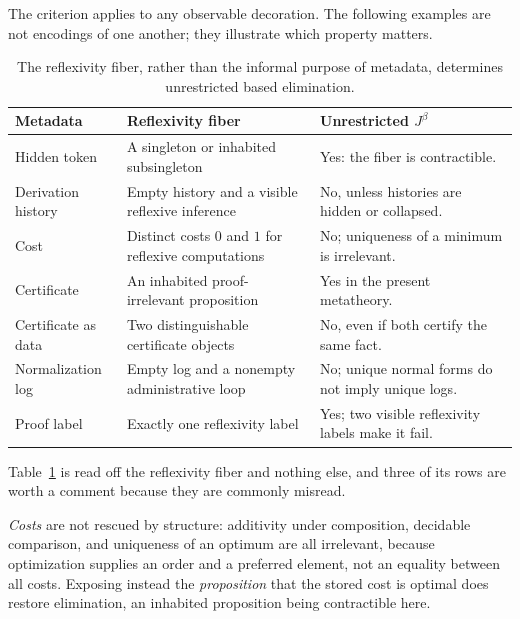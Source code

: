 \documentclass[10pt,reqno]{amsart}
\begin{document}
The criterion applies to any observable decoration.  The following examples
are not encodings of one another; they illustrate which property matters.

\begin{table}[t]
\centering
\small
\renewcommand{\arraystretch}{1.22}
\begin{tabular}{>{\raggedright\arraybackslash}p{}
                >{\raggedright\arraybackslash}p{}
                >{\raggedright\arraybackslash}p{}}
\toprule
Metadata & Reflexivity fiber & Unrestricted \(J^\beta\)\\
\midrule
Hidden token
 & A singleton or inhabited subsingleton
 & Yes: the fiber is contractible.\\
Derivation history
 & Empty history and a visible reflexive inference
 & No, unless histories are hidden or collapsed.\\
Cost
 & Distinct costs \(0\) and \(1\) for reflexive computations
 & No; uniqueness of a minimum is irrelevant.\\
Certificate
 & An inhabited proof-irrelevant proposition
 & Yes in the present metatheory.\\
Certificate as data
 & Two distinguishable certificate objects
 & No, even if both certify the same fact.\\
Normalization log
 & Empty log and a nonempty administrative loop
 & No; unique normal forms do not imply unique logs.\\
Proof label
 & Exactly one reflexivity label
 & Yes; two visible reflexivity labels make it fail.\\
\bottomrule
\end{tabular}
\caption{The reflexivity fiber, rather than the informal purpose of metadata,
determines unrestricted based elimination.}
\label{tab:examples}
\end{table}

Table~\ref{tab:examples} is read off the reflexivity fiber and nothing else,
and three of its rows are worth a comment because they are commonly misread.

\emph{Costs} are not rescued by structure: additivity under composition,
decidable comparison, and uniqueness of an optimum are all irrelevant, because
optimization supplies an order and a preferred element, not an equality between
all costs.  Exposing instead the \emph{proposition} that the stored cost is
optimal does restore elimination, an inhabited proposition being contractible
here.
\end{document}
